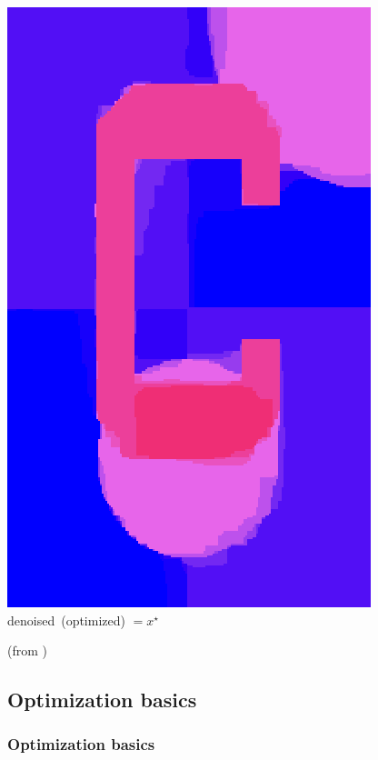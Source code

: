 \documentclass[12pt]{beamer}
\begin{document}
\begin{frame}
\begin{center}
\begin{minipage}[t]{0.2\textwidth}
\includegraphics[width=\textwidth]{c_denoised.png} \\
{\small \mbox{denoised (optimized)} $=x^\star$}
\end{minipage}
\mbox{\quad}
\end{center}
{\scriptsize (from \cite{ravikumar17}) \hfill}
\end{frame}


\subsection{Optimization basics}

\begin{frame}%
\frametitle{Optimization basics} 
\tableofcontents[currentsection]
\end{frame}
\end{document}
